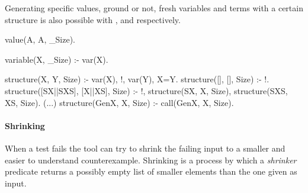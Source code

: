 Generating specific values, ground or not, fresh variables and terms
with a certain structure is also possible with ,
 and  respectively.
%
\begin{yapcode}
 value(A, A, _Size).

 variable(X, _Size) :- var(X).

 structure(X, Y, Size) :- var(X), !, var(Y), X=Y.
 structure([], [], Size) :- !.
 structure([SX||SXS], [X||XS], Size) :-
   !, structure(SX, X, Size), structure(SXS, XS, Size).
 (...)
 structure(GenX, X, Size) :- call(GenX, X, Size).
\end{yapcode}





\paragraph{\bf Shrinking}

When a test fails the tool can try to shrink the failing input to a
smaller and easier to understand counterexample.
%
Shrinking is a process by which a \emph{shrinker} predicate returns a
possibly empty list of smaller elements than the one given as input.



